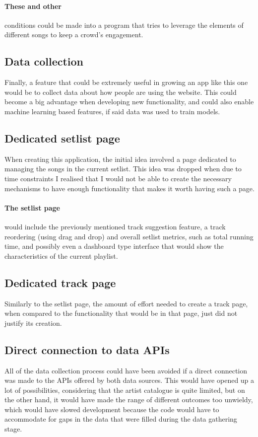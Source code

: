 \documentclass[10pt, a4paper]{article}
\begin{document}
	\paragraph{These and other} conditions could be made into a program that tries to leverage the elements of different songs to keep a crowd's engagement.
	
	\subsection{Data collection}
	Finally, a feature that could be extremely useful in growing an app like this one would be to collect data about how people are using the website. This could become a big advantage when developing new functionality, and could also enable machine learning based features, if said data was used to train models.
	
	\subsection{Dedicated setlist page}
	When creating this application, the initial idea involved a page dedicated to managing the songs in the current setlist. This idea was dropped when due to time constraints I realised that I would not be able to create the necessary mechanisms to have enough functionality that makes it worth having such a page.
	\paragraph{The setlist page} would include the previously mentioned track suggestion feature, a track reordering (using drag and drop) and overall setlist metrics, such as total running time, and possibly even a dashboard type interface that would show the characteristics of the current playlist.
	
	\subsection{Dedicated track page}
	Similarly to the setlist page, the amount of effort needed to create a track page, when compared to the functionality that would be in that page, just did not justify its creation. 
	
	\subsection{Direct connection to data APIs}
	All of the data collection process could have been avoided if a direct connection was made to the APIs offered by both data sources. This would have opened up a lot of possibilities, considering that the artist catalogue is quite limited, but on the other hand, it would have made the range of different outcomes too unwieldy, which would have slowed development because the code would have to accommodate for gaps in the data that were filled during the data gathering stage.
	
\end{document}
